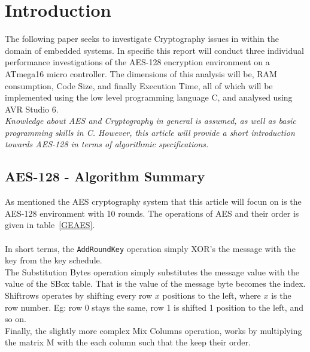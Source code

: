 \documentclass[Report.tex]{subfiles}
\begin{document}
\section{Introduction}
The following paper seeks to investigate Cryptography issues in
within the domain of embedded systems. In specific this report will conduct
three individual performance investigations of the AES-128 encryption environment 
on a ATmega16 micro controller. The dimensions of this analysis will be, RAM consumption,
Code Size, and finally Execution Time, all of which will be implemented using the low level 
programming language C, and analysed using AVR Studio 6. \\
\textit{Knowledge about AES and Cryptography in general is assumed, 
as well as basic programming skills in C. However, this article will provide a short introduction
towards AES-128 in terms of algorithmic specifications.}

\subsection{AES-128 - Algorithm Summary}\label{ALGsum}
As mentioned the AES cryptography system that this 
article will focun on is the AES-128 environment with 10 rounds.
The operations of AES and their order is given in table~\ref{GEAES}.\\\\
In short terms, the \verb+AddRoundKey+ operation simply XOR's the message
with the key from the key schedule.\\
The Substitution Bytes operation simply substitutes the message value with the value
of the SBox table. That is the value of the message byte becomes the index.\\
Shiftrows operates by shifting every row $x$ positions to the left, where $x$ is the row number.
Eg: row 0 stays the same, row 1 is shifted 1 position to the left, and so on.\\
Finally, the slightly more complex Mix Columns operation, works by multiplying the matrix M
with the each column such that the keep their order.
\end{document}
